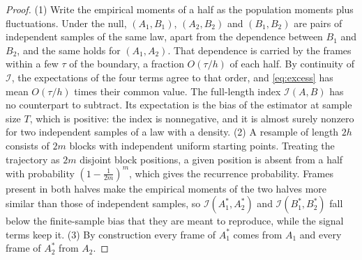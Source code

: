 \documentclass[11pt,reqno]{amsart}
\theoremstyle{plain}
\theoremstyle{definition}
\theoremstyle{remark}
\numberwithin{equation}{section}
\begin{document}
\begin{proof}
(1) Write the empirical moments of a half as the population moments plus fluctuations. Under the null, $(A_1,B_1)$, $(A_2,B_2)$ and $(B_1,B_2)$ are pairs of independent samples of the same law, apart from the dependence between $B_1$ and $B_2$, and the same holds for $(A_1,A_2)$. That dependence is carried by the frames within a few $\tau$ of the boundary, a fraction $O(\tau/h)$ of each half. By continuity of $\mathcal I$, the expectations of the four terms agree to that order, and \eqref{eq:excess} has mean $O(\tau/h)$ times their common value. The full-length index $\mathcal I(A,B)$ has no counterpart to subtract. Its expectation is the bias of the estimator at sample size $T$, which is positive: the index is nonnegative, and it is almost surely nonzero for two independent samples of a law with a density.
(2) A resample of length $2h$ consists of $2m$ blocks with independent uniform starting points. Treating the trajectory as $2m$ disjoint block positions, a given position is absent from a half with probability $(1-\tfrac1{2m})^m$, which gives the recurrence probability. Frames present in both halves make the empirical moments of the two halves more similar than those of independent samples, so $\mathcal I(A^*_1,A^*_2)$ and $\mathcal I(B^*_1,B^*_2)$ fall below the finite-sample bias that they are meant to reproduce, while the signal terms keep it.
(3) By construction every frame of $A^*_1$ comes from $A_1$ and every frame of $A^*_2$ from $A_2$.
\end{proof}
\end{document}

